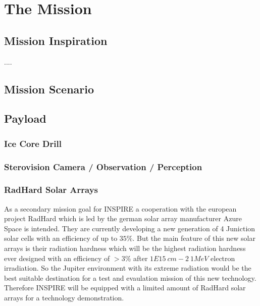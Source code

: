 %
%
%
\chapter{The Mission}
\label{chap:mission}

\section{Mission Inspiration}
\label{sec:inspiration}
....



\section{Mission Scenario}
\label{sec:scenario}


\section{Payload}


\subsection{Ice Core Drill}

\subsection{Sterovision Camera / Observation / Perception}

\subsection{RadHard Solar Arrays}
\label{subsec:radhard}
As a secondary mission goal for INSPIRE a cooperation with the european project RadHard which is led by the german solar array manufacturer Azure Space is intended. They are currently developing a new generation of 4 Juniction solar cells with an efficiency of up to $35 \% $. But the main feature of this new solar arrays is their radiation hardness which will be the highest radiation hardness ever designed with an efficiency of $>3 \% $ after $1E15 \ cm-2 \ 1MeV$ electron irradiation. So the Jupiter environment with its extreme radiation would be the best suitable destination for a test and evaulation mission of this new technology. Therefore INSPIRE will be equipped with a limited amount of RadHard solar arrays for a technology demonstration.


